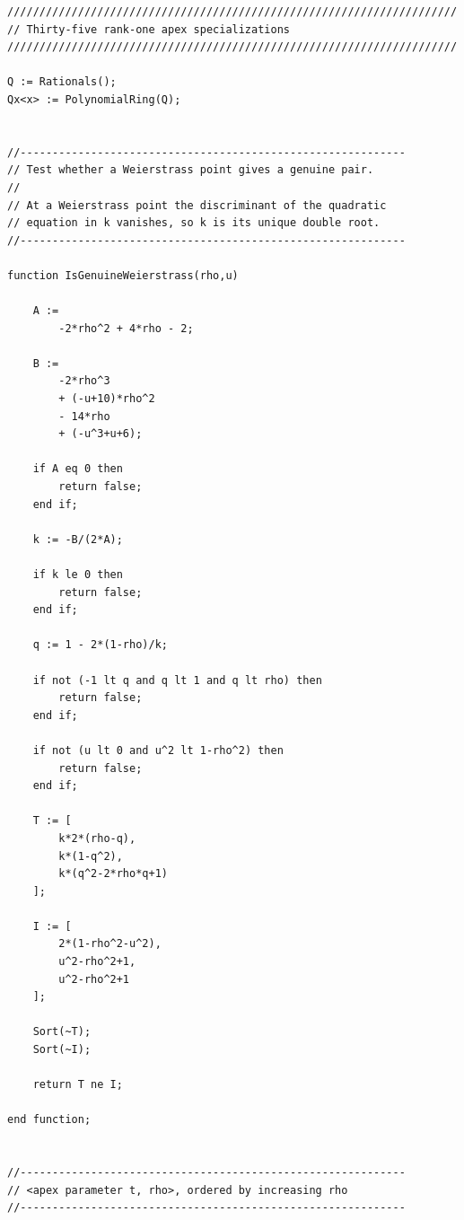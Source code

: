 \documentclass[11pt]{amsart}
\theoremstyle{plain}
\theoremstyle{remark}
\theoremstyle{plain}
\begin{document}
\begin{verbatim}
//////////////////////////////////////////////////////////////////////
// Thirty-five rank-one apex specializations
//////////////////////////////////////////////////////////////////////

Q := Rationals();
Qx<x> := PolynomialRing(Q);


//------------------------------------------------------------
// Test whether a Weierstrass point gives a genuine pair.
//
// At a Weierstrass point the discriminant of the quadratic
// equation in k vanishes, so k is its unique double root.
//------------------------------------------------------------

function IsGenuineWeierstrass(rho,u)

    A :=
        -2*rho^2 + 4*rho - 2;

    B :=
        -2*rho^3
        + (-u+10)*rho^2
        - 14*rho
        + (-u^3+u+6);

    if A eq 0 then
        return false;
    end if;

    k := -B/(2*A);

    if k le 0 then
        return false;
    end if;

    q := 1 - 2*(1-rho)/k;

    if not (-1 lt q and q lt 1 and q lt rho) then
        return false;
    end if;

    if not (u lt 0 and u^2 lt 1-rho^2) then
        return false;
    end if;

    T := [
        k*2*(rho-q),
        k*(1-q^2),
        k*(q^2-2*rho*q+1)
    ];

    I := [
        2*(1-rho^2-u^2),
        u^2-rho^2+1,
        u^2-rho^2+1
    ];

    Sort(~T);
    Sort(~I);

    return T ne I;

end function;


//------------------------------------------------------------
// <apex parameter t, rho>, ordered by increasing rho
//------------------------------------------------------------


\end{verbatim}
\end{document}
